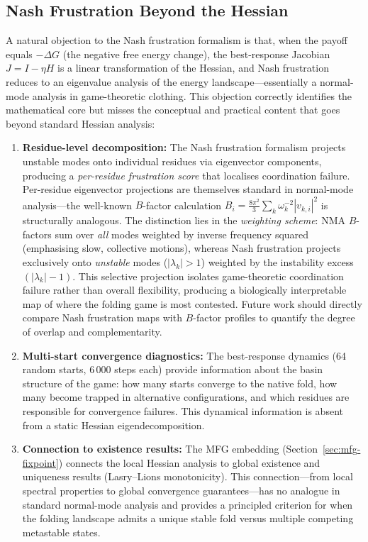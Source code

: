 \documentclass[12pt,a4paper]{article}
\theoremstyle{remark}
\begin{document}
\subsection{Nash Frustration Beyond the Hessian}

A natural objection to the Nash frustration formalism is that, when the payoff equals $-\Delta G$ (the negative free energy change), the best-response Jacobian $J = I - \eta H$ is a linear transformation of the Hessian, and Nash frustration reduces to an eigenvalue analysis of the energy landscape---essentially a normal-mode analysis in game-theoretic clothing. This objection correctly identifies the mathematical core but misses the conceptual and practical content that goes beyond standard Hessian analysis:

\begin{enumerate}
    \item \textbf{Residue-level decomposition:} The Nash frustration formalism projects unstable modes onto individual residues via eigenvector components, producing a \emph{per-residue frustration score} that localises coordination failure. Per-residue eigenvector projections are themselves standard in normal-mode analysis---the well-known $B$-factor calculation $B_i = \frac{8\pi^2}{3}\sum_k \omega_k^{-2}|v_{k,i}|^2$ is structurally analogous. The distinction lies in the \emph{weighting scheme}: NMA $B$-factors sum over \emph{all} modes weighted by inverse frequency squared (emphasising slow, collective motions), whereas Nash frustration projects exclusively onto \emph{unstable} modes ($|\lambda_k|>1$) weighted by the instability excess $(|\lambda_k|-1)$. This selective projection isolates game-theoretic coordination failure rather than overall flexibility, producing a biologically interpretable map of where the folding game is most contested. Future work should directly compare Nash frustration maps with $B$-factor profiles to quantify the degree of overlap and complementarity.
    \item \textbf{Multi-start convergence diagnostics:} The best-response dynamics (64 random starts, 6\,000 steps each) provide information about the basin structure of the game: how many starts converge to the native fold, how many become trapped in alternative configurations, and which residues are responsible for convergence failures. This dynamical information is absent from a static Hessian eigendecomposition.
    \item \textbf{Connection to existence results:} The MFG embedding (Section~\ref{sec:mfg-fixpoint}) connects the local Hessian analysis to global existence and uniqueness results (Lasry--Lions monotonicity). This connection---from local spectral properties to global convergence guarantees---has no analogue in standard normal-mode analysis and provides a principled criterion for when the folding landscape admits a unique stable fold versus multiple competing metastable states.

\end{enumerate}
\end{document}
